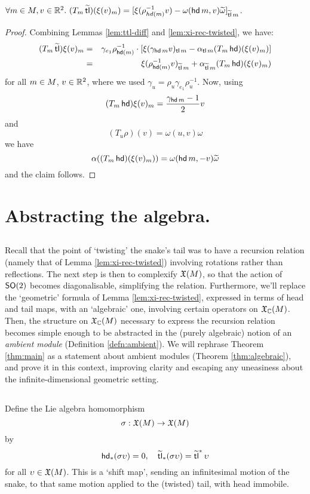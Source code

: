 \begin{lem}\label{lem:xi-rec-twisted}
$\forall m \in M, v \in {\mathbb{R}}^2.\ (T_m \operatorname{\widetilde{\operatorname{\mathsf{tl}}}})(\xi(v)_m) = [ \xi(\rho_{hd(m)}^{-1} v) - \omega(\operatorname{\mathsf{hd}} m, v) \widetilde{\omega} ]_{\operatorname{\widetilde{\operatorname{\mathsf{tl}}}} m}$.
\end{lem}
\begin{proof}
Combining Lemmas \ref{lem:ttl-diff} and \ref{lem:xi-rec-twisted}, we have:
\begin{eqnarray*}
        (T_m \operatorname{\widetilde{\operatorname{\mathsf{tl}}}})\xi(v)_m &=& \gamma_{e_1} \rho_{\operatorname{\mathsf{hd}}(m)}^{-1} \cdot [ \xi(\gamma_{\operatorname{\mathsf{hd}} m} v)_{\operatorname{\mathsf{tl}} m} - \alpha_{\operatorname{\mathsf{tl}} m} (T_m \operatorname{\mathsf{hd}})(\xi(v)_m) ] \\
                           &=& \xi(\rho_{\operatorname{\mathsf{hd}}(m)}^{-1} v)_{\operatorname{\widetilde{\operatorname{\mathsf{tl}}}} m} + \alpha_{\operatorname{\widetilde{\operatorname{\mathsf{tl}}}} m} (T_m \operatorname{\mathsf{hd}})(\xi(v)_m) 
\end{eqnarray*}
for all $m \in M$, $v\in{\mathbb{R}}^2$, where we used $\gamma_u = \rho_u \gamma_{e_1} \rho_u^{-1}$. Now, using
\[
        (T_m \operatorname{\mathsf{hd}}) \xi(v)_m = \frac{\gamma_{\operatorname{\mathsf{hd}} m}-1}{2} v
\]
and
\[
  (T_u \rho)(v) = \omega(u,v)\omega 
\]
we have
\[
  \alpha((T_m \operatorname{\mathsf{hd}})(\xi(v)_m)) = \omega(\operatorname{\mathsf{hd}} m, -v) \widetilde{\omega}
\]
and the claim follows. 
\end{proof}
\section{Abstracting the algebra.}
\label{sec:abstracting}
\subsection*{}
Recall that the point of `twisting' the snake's tail was to have a
recursion relation (namely that of Lemma \ref{lem:xi-rec-twisted})
involving rotations rather than reflections. The next step is then
to complexify $\mathfrak{X}(M)$, so that the action of $\mathsf{SO}(2)$ becomes
diagonalisable, simplifying the relation. Furthermore, we'll replace
the `geometric' formula of Lemma \ref{lem:xi-rec-twisted}, expressed
in terms of head and tail maps, with an `algebraic' one, involving
certain operators on $\mathfrak{X}_{{\mathbb{C}}}(M)$. Then, the structure on $\mathfrak{X}_{{\mathbb{C}}}(M)$ necessary to
express the recursion relation becomes simple enough to be abstracted in the (purely algebraic)
notion of an \emph{ambient module} (Definition \ref{defn:ambient}). We will 
rephrase Theorem \ref{thm:main} as a statement about ambient modules (Theorem \ref{thm:algebraic}), and prove it
in this context, improving clarity and escaping any uneasiness about the infinite-dimensional
geometric setting.


\subsection{}
Define the Lie algebra homomorphism
\[
  \sigma : \mathfrak{X}(M) \to \mathfrak{X}(M)
\]
by
\[
  \operatorname{\mathsf{hd}}_* (\sigma\upsilon) = 0, \quad \operatorname{\widetilde{\operatorname{\mathsf{tl}}}}_* (\sigma\upsilon) = \operatorname{\widetilde{\operatorname{\mathsf{tl}}}}^* \upsilon
\]
for all $\upsilon\in\mathfrak{X}(M)$. This is a `shift map', sending
an infinitesimal motion of the snake, to that same
motion applied to the (twisted) tail, with head immobile.


